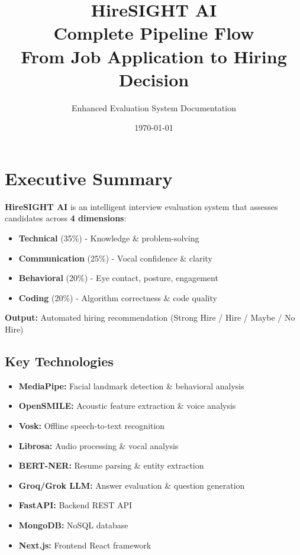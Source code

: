\documentclass[12pt,a4paper]{article}
\title{\textbf{\Huge HireSIGHT AI} \\[0.5cm] 
\Large Complete Pipeline Flow \\[0.3cm]
\large From Job Application to Hiring Decision}
\author{Enhanced Evaluation System Documentation}
\date{\today}
\begin{document}
\maketitle
\newpage

\tableofcontents
\newpage

\section{Executive Summary}

\begin{tcolorbox}[colback=primaryblue!5,colframe=primaryblue,title=\textbf{System Overview}]
\textbf{HireSIGHT AI} is an intelligent interview evaluation system that assesses candidates across \textbf{4 dimensions}:

\begin{itemize}[leftmargin=*]
    \item \textbf{Technical} (35\%) - Knowledge \& problem-solving
    \item \textbf{Communication} (25\%) - Vocal confidence \& clarity
    \item \textbf{Behavioral} (20\%) - Eye contact, posture, engagement
    \item \textbf{Coding} (20\%) - Algorithm correctness \& code quality
\end{itemize}

\textbf{Output:} Automated hiring recommendation (Strong Hire / Hire / Maybe / No Hire)
\end{tcolorbox}

\subsection{Key Technologies}
\begin{itemize}
    \item \textbf{MediaPipe:} Facial landmark detection \& behavioral analysis
    \item \textbf{OpenSMILE:} Acoustic feature extraction \& voice analysis
    \item \textbf{Vosk:} Offline speech-to-text recognition
    \item \textbf{Librosa:} Audio processing \& vocal analysis
    \item \textbf{BERT-NER:} Resume parsing \& entity extraction
    \item \textbf{Groq/Grok LLM:} Answer evaluation \& question generation
    \item \textbf{FastAPI:} Backend REST API
    \item \textbf{MongoDB:} NoSQL database
    \item \textbf{Next.js:} Frontend React framework
\end{itemize}
\end{document}
